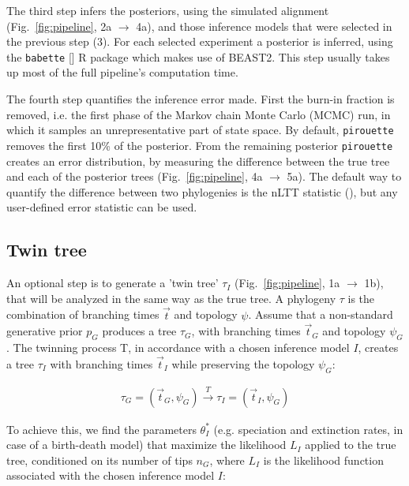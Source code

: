 \documentclass{article}
\begin{document}
The third step infers the posteriors,
using the simulated alignment (Fig.~\ref{fig:pipeline}, 2a $\rightarrow$ 4a),
and those inference models that were selected in the previous step (3). 
For each selected experiment a posterior is inferred, using the 
\verb;babette; [\cite{bilderbeek2018babette}] R package which makes use of BEAST2. 
This step usually takes up most of the full pipeline's computation time.

The fourth step quantifies the inference error made. First the 
burn-in fraction is removed, i.e. the first phase of the Markov chain Monte Carlo (MCMC) run,
in which it samples an unrepresentative part of state space. By default, \verb;pirouette; 
removes the first 10\% of the posterior.
From the remaining posterior \verb;pirouette; 
creates an error distribution, by measuring the difference
between the true tree and each of the posterior 
trees (Fig.~\ref{fig:pipeline}, 4a $\rightarrow$ 5a).
The default way to quantify the difference between two phylogenies
is the nLTT statistic (\cite{janzen2015approximate}), but any 
user-defined error statistic can be used.

\subsection{Twin tree}\label{subsec:twinning}

An optional step is to generate a 'twin tree' $\tau_{I}$
(Fig.~\ref{fig:pipeline}, 1a $\rightarrow$ 1b),
that will be analyzed in the same way as the true tree.
A phylogeny $\tau$ is the combination of 
branching times $\Vec{t}$ and topology $\psi$.
Assume that a non-standard generative prior $\mathit{p_{G}}$
produces a tree $\tau_{\mathit{G}}$,
with branching times $\Vec{t}_{\mathit{G}}$ and 
topology $\psi_{\mathit{G}}$.
The twinning process T, in accordance with a chosen inference 
model $\mathit{I}$, creates a tree $\tau_{\mathit{I}}$
with branching times $\Vec{t}_{\mathit{I}}$ while preserving the 
topology $\psi_{\mathit{G}}$:

\begin{align}
  \tau_{\mathit{G}} = (\Vec{t}_{\mathit{G}}, \psi_{\mathit{G}}) 
  \xrightarrow[]{\mathit{T}} 
  \tau_{\mathit{I}} = (\Vec{t}_{\mathit{I}}, \psi_{\mathit{G}})
\end{align}

To achieve this, we find the parameters $\theta^{*}_{\mathit{I}}$ 
(e.g. speciation and extinction rates, in case of a birth-death model) 
that maximize the likelihood $L_{\mathit{I}}$ applied 
to the true tree, conditioned on its number of tips $n_{\mathit{G}}$,
where $L_{\mathit{I}}$ is the likelihood function  
associated with the chosen inference model $\mathit{I}$:
\end{document}

